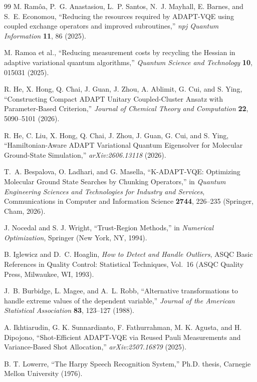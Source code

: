\documentclass[
  reprint,
  amsmath,
  amssymb,
  aps,
  pra,
  nofootinbib,
  superscriptaddress,
  floatfix
]{revtex4-2}
\begin{document}
\begin{thebibliography}{99}
M. Ram\^oa, P.~G. Anastasiou, L.~P. Santos, N.~J. Mayhall, E. Barnes, and S.~E. Economou,
``Reducing the resources required by ADAPT-VQE using coupled exchange operators and improved subroutines,''
\emph{npj Quantum Information} \textbf{11}, 86 (2025).

M. Ramoa et al.,
``Reducing measurement costs by recycling the Hessian in adaptive variational quantum algorithms,''
\emph{Quantum Science and Technology} \textbf{10}, 015031 (2025).

R. He, X. Hong, Q. Chai, J. Guan, J. Zhou, A. Ablimit, G. Cui, and S. Ying,
``Constructing Compact ADAPT Unitary Coupled-Cluster Ansatz with Parameter-Based Criterion,''
\emph{Journal of Chemical Theory and Computation} \textbf{22}, 5090--5101 (2026).

R. He, C. Liu, X. Hong, Q. Chai, J. Zhou, J. Guan, G. Cui, and S. Ying,
``Hamiltonian-Aware ADAPT Variational Quantum Eigensolver for Molecular Ground-State Simulation,''
\emph{arXiv:2606.13118} (2026).

T.~A. Bespalova, O. Ladhari, and G. Masella,
``K-ADAPT-VQE: Optimizing Molecular Ground State Searches by Chunking Operators,''
in \emph{Quantum Engineering Sciences and Technologies for Industry and Services}, Communications in Computer and Information Science \textbf{2744}, 226--235 (Springer, Cham, 2026).

J. Nocedal and S. J. Wright,
``Trust-Region Methods,''
in \emph{Numerical Optimization}, Springer (New York, NY, 1994).

B. Iglewicz and D.~C. Hoaglin,
\emph{How to Detect and Handle Outliers},
ASQC Basic References in Quality Control: Statistical Techniques, Vol.~16
(ASQC Quality Press, Milwaukee, WI, 1993).

J.~B. Burbidge, L. Magee, and A.~L. Robb,
``Alternative transformations to handle extreme values of the dependent variable,''
\emph{Journal of the American Statistical Association} \textbf{83}, 123--127 (1988).

A. Ikhtiarudin, G. K. Sunnardianto, F. Fathurrahman, M. K. Agusta, and H. Dipojono,
``Shot-Efficient ADAPT-VQE via Reused Pauli Measurements and Variance-Based Shot Allocation,''
\emph{arXiv:2507.16879} (2025).

B. T. Lowerre,
``The Harpy Speech Recognition System,''
Ph.D. thesis, Carnegie Mellon University (1976).


\end{thebibliography}
\end{document}
